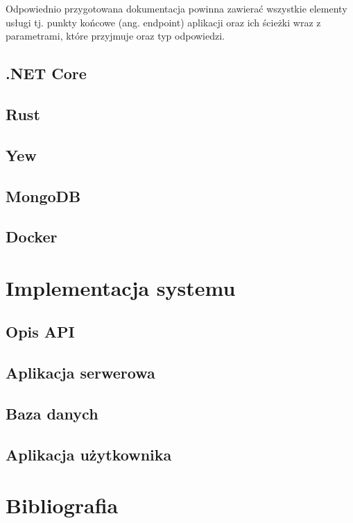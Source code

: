 \documentclass[12pt,a4paper]{article}
\begin{document}
Odpowiednio przygotowana dokumentacja powinna zawierać wszystkie elementy usługi tj.
punkty końcowe (ang. endpoint) aplikacji oraz ich ścieżki wraz z parametrami, które
przyjmuje oraz typ odpowiedzi.

\subsection{.NET Core}
\subsection{Rust}
\subsection{Yew}
\subsection{MongoDB}
\subsection{Docker}

\section{Implementacja systemu}
\subsection{Opis API}
\subsection{Aplikacja serwerowa}
\subsection{Baza danych}
\subsection{Aplikacja użytkownika}

\section{Bibliografia}
\end{document}
